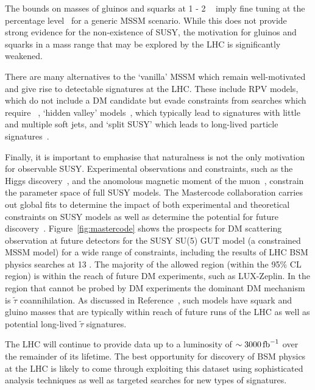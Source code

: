 The bounds on masses of gluinos and squarks at 1 - 2 \TeV~ imply fine
tuning at the percentage level~\cite{hmus} for a generic MSSM scenario. 
While this does not provide strong evidence for the non-existence of SUSY,
the motivation for gluinos and squarks in a mass range that may be explored 
by the LHC is significantly weakened.  

There are many alternatives to the `vanilla' MSSM which remain well-motivated 
and give rise to detectable signatures at the LHC. These include RPV models,
which do not include a DM candidate but evade constraints from searches which require \met~\cite{rpv}, 
`hidden valley' models~\cite{hValley}, which typically lead to signatures with little \met and multiple
soft jets, and `split SUSY' which leads to long-lived particle signatures~\cite{sSusy}.

Finally, it is important to emphasise that naturalness is not the only motivation
for observable SUSY. Experimental observations and constraints, such as the Higgs discovery~\cite{cmsHiggs,atlasHiggs},
and the anomolous magnetic moment of the muon~\cite{gm2}, constrain the parameter
space of full SUSY models. The Mastercode collaboration carries out global fits to determine 
the impact of both experimental and theoretical constraints on SUSY models as well 
as determine the potential for future discovery~\cite{mastercode}. 
Figure~\ref{fig:mastercode} shows the prospects for DM scattering observation at 
future detectors for the SUSY SU(5) GUT model (a constrained MSSM model) for a wide
range of constraints, including the results of LHC BSM physics searches at 13 \TeV.
The majority of the allowed region (within the 95\% CL region) 
is within the reach of future DM experiments,
such as LUX-Zeplin. In the region that cannot be probed by DM experiments
the dominant DM mechanism is $\tilde{\tau}$ coannihilation.
As discussed in Reference~\cite{mastercode}, such models have squark and gluino
masses that are typically within reach of future runs of the LHC
as well as potential long-lived $\tilde{\tau}$ signatures.

The LHC will continue to provide data up to a luminosity of $\sim 3000\,\text{fb}^{-1}$ over the 
remainder of its lifetime. The best opportunity for discovery of 
BSM physics at the LHC is likely to come through exploiting this dataset 
using sophisticated analysis techniques as well as targeted searches 
for new types of signatures.

